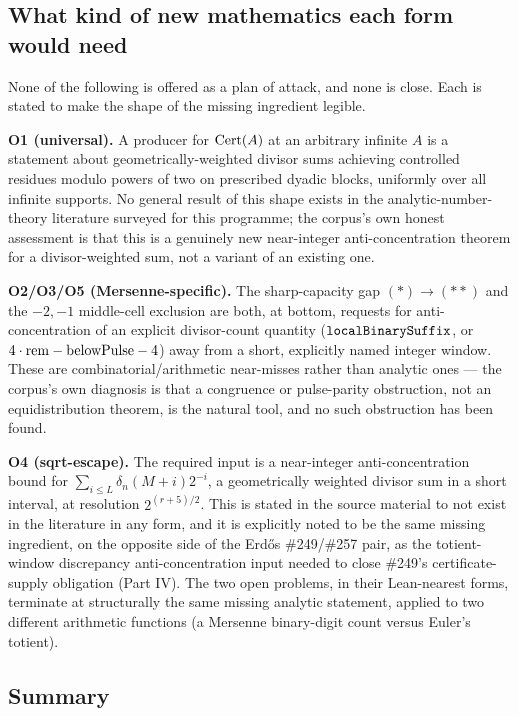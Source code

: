 \documentclass[11pt]{article}
\theoremstyle{plain}
\theoremstyle{definition}
\theoremstyle{remark}
\let\origmathtt\mathtt
\renewcommand{\mathtt}[1]{\ifmmode\origmathtt{#1}\else\texttt{#1}\fi}%
\let\origmathrm\mathrm
\renewcommand{\mathrm}[1]{\ifmmode\origmathrm{#1}\else\textrm{#1}\fi}%
\begin{document}
\subsection{What kind of new mathematics each form would need}

None of the following is offered as a plan of attack, and none is close. Each is stated to make
the shape of the missing ingredient legible.

\textbf{O1 (universal).} A producer for $\mathrm{Cert}(A)$ at an arbitrary infinite $A$ is a
statement about geometrically-weighted divisor sums achieving controlled residues modulo powers of
two on prescribed dyadic blocks, uniformly over all infinite supports. No general result of this
shape exists in the analytic-number-theory literature surveyed for this programme; the corpus's
own honest assessment is that this is a genuinely new near-integer anti-concentration theorem for
a divisor-weighted sum, not a variant of an existing one.

\textbf{O2/O3/O5 (Mersenne-specific).} The sharp-capacity gap $(\ast)\to(\ast\ast)$ and the
$-2,-1$ middle-cell exclusion are both, at bottom, requests for anti-concentration of an explicit
divisor-count quantity ($\mathtt{localBinarySuffix}$, or $4\cdot\mathrm{rem}-\mathrm{belowPulse}-4$)
away from a short, explicitly named integer window. These are combinatorial/arithmetic
near-misses rather than analytic ones — the corpus's own diagnosis is that a congruence or
pulse-parity obstruction, not an equidistribution theorem, is the natural tool, and no such
obstruction has been found.

\textbf{O4 (sqrt-escape).} The required input is a near-integer anti-concentration bound for
$\sum_{i\le L}\delta_n(M+i)2^{-i}$, a geometrically weighted divisor sum in a short interval, at
resolution $2^{(r+5)/2}$. This is stated in the source material to not exist in the literature in
any form, and it is explicitly noted to be the same missing ingredient, on the opposite side of
the Erd\H{o}s \#249/\#257 pair, as the totient-window discrepancy anti-concentration input needed
to close \#249's certificate-supply obligation (Part IV). The two open problems, in their
Lean-nearest forms, terminate at structurally the same missing analytic statement, applied to two
different arithmetic functions (a Mersenne binary-digit count versus Euler's totient).

\subsection{Summary}
\end{document}
